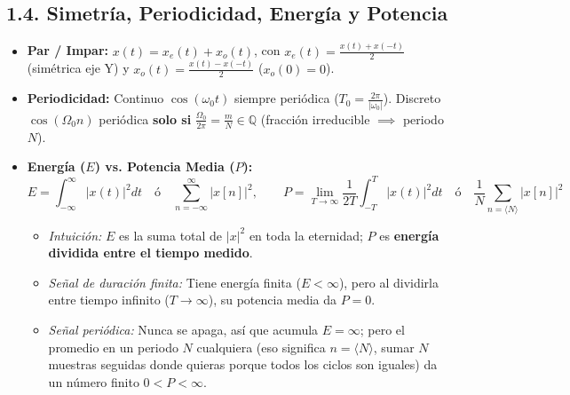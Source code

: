 \documentclass[10pt,a4paper]{article}
\begin{document}
	\subsection*{1.4. Simetría, Periodicidad, Energía y Potencia}
	\begin{itemize}
		\item \textbf{Par / Impar:} $x(t) = x_e(t) + x_o(t)$, con $x_e(t) = \frac{x(t)+x(-t)}{2}$ (simétrica eje Y) y $x_o(t) = \frac{x(t)-x(-t)}{2}$ ($x_o(0)=0$).
		\item \textbf{Periodicidad:} Continuo $\cos(\omega_0 t)$ siempre periódica ($T_0 = \frac{2\pi}{|\omega_0|}$). Discreto $\cos(\Omega_0 n)$ periódica \textbf{solo si} $\frac{\Omega_0}{2\pi} = \frac{m}{N} \in \mathbb{Q}$ (fracción irreducible $\implies$ periodo $N$).
		\item \textbf{Energía ($E$) vs. Potencia Media ($P$):}
		$$E = \int_{-\infty}^{\infty}|x(t)|^2 dt \quad \text{ó} \quad \sum_{n=-\infty}^{\infty}|x[n]|^2, \qquad P = \lim_{T\to\infty}\frac{1}{2T}\int_{-T}^{T}|x(t)|^2 dt \quad \text{ó} \quad \frac{1}{N}\sum_{n=\langle N\rangle}|x[n]|^2$$
		\begin{itemize}
			\item \emph{Intuición:} $E$ es la suma total de $|x|^2$ en toda la eternidad; $P$ es \textbf{energía dividida entre el tiempo medido}.
			\item \emph{Señal de duración finita:} Tiene energía finita ($E < \infty$), pero al dividirla entre tiempo infinito ($T \to \infty$), su potencia media da $P = 0$.
			\item \emph{Señal periódica:} Nunca se apaga, así que acumula $E = \infty$; pero el promedio en un periodo $N$ cualquiera (eso significa $n = \langle N \rangle$, sumar $N$ muestras seguidas donde quieras porque todos los ciclos son iguales) da un número finito $0 < P < \infty$.
		\end{itemize}
	\end{itemize}
	
\end{document}
